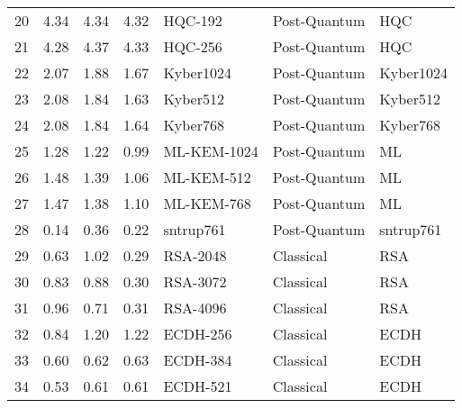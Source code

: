 \begin{table}
\begin{tabular}{lrrrlll}
20 & 4.34 & 4.34 & 4.32 & HQC-192 & Post-Quantum & HQC \\
21 & 4.28 & 4.37 & 4.33 & HQC-256 & Post-Quantum & HQC \\
22 & 2.07 & 1.88 & 1.67 & Kyber1024 & Post-Quantum & Kyber1024 \\
23 & 2.08 & 1.84 & 1.63 & Kyber512 & Post-Quantum & Kyber512 \\
24 & 2.08 & 1.84 & 1.64 & Kyber768 & Post-Quantum & Kyber768 \\
25 & 1.28 & 1.22 & 0.99 & ML-KEM-1024 & Post-Quantum & ML \\
26 & 1.48 & 1.39 & 1.06 & ML-KEM-512 & Post-Quantum & ML \\
27 & 1.47 & 1.38 & 1.10 & ML-KEM-768 & Post-Quantum & ML \\
28 & 0.14 & 0.36 & 0.22 & sntrup761 & Post-Quantum & sntrup761 \\
29 & 0.63 & 1.02 & 0.29 & RSA-2048 & Classical & RSA \\
30 & 0.83 & 0.88 & 0.30 & RSA-3072 & Classical & RSA \\
31 & 0.96 & 0.71 & 0.31 & RSA-4096 & Classical & RSA \\
32 & 0.84 & 1.20 & 1.22 & ECDH-256 & Classical & ECDH \\
33 & 0.60 & 0.62 & 0.63 & ECDH-384 & Classical & ECDH \\
34 & 0.53 & 0.61 & 0.61 & ECDH-521 & Classical & ECDH \\
\bottomrule
\end{tabular}
\end{table}
